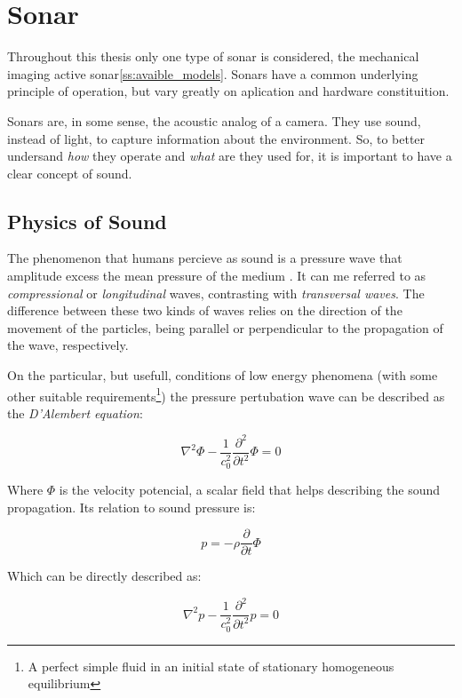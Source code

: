 \section{Sonar}

Throughout this thesis only one type of sonar is considered, the mechanical
imaging active sonar\ref{ss:avaible_models}. Sonars have a common underlying
principle of operation, but vary greatly on aplication and hardware constituition.

Sonars are, in some sense, the acoustic analog of a camera. They use sound,
instead of light, to capture information about the environment. So, to better
undersand \textit{how} they operate and \textit{what} are they used for, it is
important to have a clear concept of sound.

\subsection{Physics of Sound}

The phenomenon that humans percieve as sound is a pressure wave that amplitude
excess the mean pressure of the medium \cite{FEYNMAN}. It can me referred to as
\textit{compressional} or \textit{longitudinal} waves, contrasting with
\textit{transversal waves}. The difference between these two kinds of waves
relies on the direction of the movement of the particles, being parallel or
perpendicular to the propagation of the wave, respectively\cite{BRUNEAU}.

On the particular, but usefull, conditions of low energy
phenomena\cite{Lefebvre} (with some other suitable requirements\footnote{A
perfect simple fluid in an initial state of stationary homogeneous equilibrium})
the pressure pertubation wave can be described as the \textit{D'Alembert
equation}:
 
\begin{equation}\label{eq:lambert}
\nabla^2 \Phi - \frac{1}{c^2_0}\frac{\partial^2}{\partial t^2} \Phi = 0
\end{equation}

Where $\Phi$ is the velocity potencial, a scalar field that helps describing the
sound propagation. Its relation to sound pressure is:

\[ p =  -\rho \frac{\partial}{\partial t}\Phi \]

Which can be directly described as:

\begin{equation} \label{eq:wave}
\nabla^2 p - \frac{1}{c^2_0}\frac{\partial^2}{\partial t^2} p = 0
\end{equation} 
 

